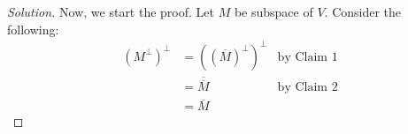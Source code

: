 \begin{proof}[Solution]
Now, we start the proof. Let $M$ be subspace of $V$. Consider the following:
 \begin{align*}
    \left( M^{\perp} \right) ^{\perp} &= \left( \left( \overline M \right) ^{\perp} \right) ^{\perp} & \text{by Claim 1}  \\
    &= \overline{\overline{M}} & \text{by Claim 2} \\
    &= \overline M
    \end{align*}

    
\end{proof}
